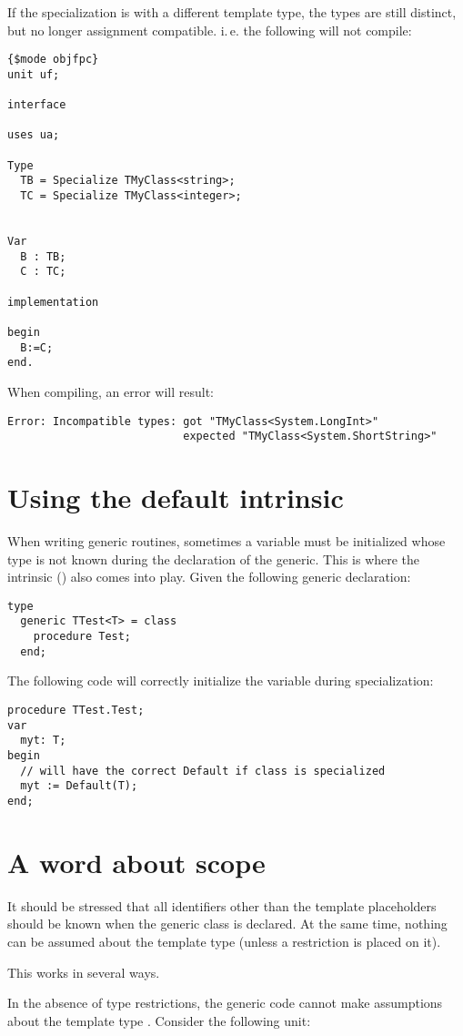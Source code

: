 If the specialization is with a different template type, the types are still distinct, but no longer assignment
compatible. i.\,e. the following will not compile:
\begin{verbatim}
{$mode objfpc}
unit uf;

interface

uses ua;

Type
  TB = Specialize TMyClass<string>;
  TC = Specialize TMyClass<integer>;


Var
  B : TB;
  C : TC;

implementation

begin
  B:=C;
end.
\end{verbatim}
When compiling, an error will result:
\begin{verbatim}
Error: Incompatible types: got "TMyClass<System.LongInt>"
                           expected "TMyClass<System.ShortString>"
\end{verbatim}

\section{Using the default intrinsic}
\label{se:genericdefault}
When writing generic routines, sometimes a variable must be initialized whose type is not known during the declaration of the generic.
This is where the  intrinsic () also comes into play. Given the following generic declaration:
\begin{verbatim}
type
  generic TTest<T> = class
    procedure Test;
  end;
\end{verbatim}
The following code will correctly initialize the variable  during specialization:
\begin{verbatim}
procedure TTest.Test;
var
  myt: T;
begin
  // will have the correct Default if class is specialized
  myt := Default(T);
end;
\end{verbatim}

\section{A word about scope}
It should be stressed that all identifiers other than the template placeholders
should be known when the generic class is declared. At the same time,
nothing can be assumed about the template type (unless a restriction is
placed on it).

This works in several ways.

In the absence of type restrictions, the generic code cannot make
assumptions about the template type . Consider the following unit:

